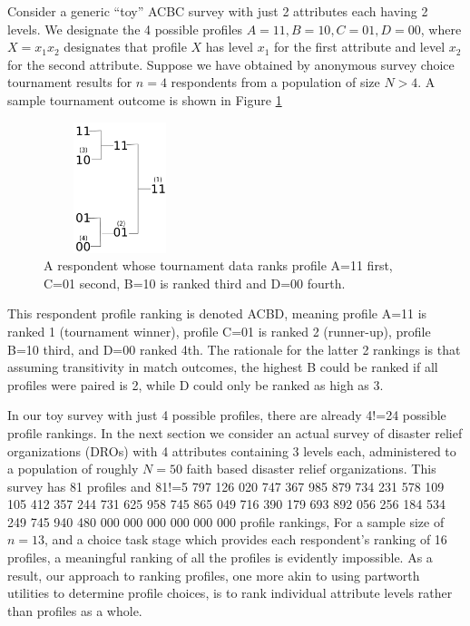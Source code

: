 \documentclass[a4paper, 12pt]{article}
\begin{document}
Consider a generic ``toy'' ACBC survey with just 2 attributes each having 2 levels. We designate the 4 possible profiles $A=11, B=10, C=01, D=00$, where $X=x_1x_2$ designates that profile $X$ has level $x_1$ for the first attribute and level $x_2$ for the second attribute. Suppose we have obtained by anonymous survey choice tournament results  for $n=4$ respondents from a population of size $N>4$.  A sample tournament outcome is shown in Figure \ref{SimpleTourn}
\begin{figure}[!htpb]
\centering
\includegraphics[width=1.75in, height=1.5in]{SimpleTourn.png}
\caption{A respondent whose tournament data ranks profile A=11 first, C=01 second, B=10 is ranked third and D=00 fourth.  }
\label{SimpleTourn}
\end{figure}

{\flushleft This} respondent profile ranking is denoted ACBD, meaning profile A=11 is ranked 1 (tournament winner), profile C=01 is ranked 2 (runner-up), profile B=10 third, and D=00 ranked 4th. The rationale for the latter 2 rankings is that assuming transitivity in match outcomes, the highest B could be ranked if all profiles were paired is 2, while D could only be ranked as high as 3. 

In our toy survey with just 4 possible profiles, there are already 4!=24 possible profile rankings. In the next section we consider an actual survey of disaster relief organizations (DROs) with 4 attributes containing 3 levels each, administered to a population of roughly $N=50$ faith based disaster relief organizations. This survey  has 81 profiles and 81!=5 797 126 020 747 367 985 879 734 231 578 109 105 412 357 244 731 625 958 745 865 049 716 390
 179 693 892 056 256 184 534 249 745 940 480 000 000 000 000 000 000 profile rankings,  For a sample size of $n=13$, and a choice task stage  which provides each respondent's ranking of 16 profiles, a meaningful ranking of  all the profiles is evidently impossible. As a result, our approach to ranking profiles, one more akin to using partworth utilities to determine profile choices, is to rank individual attribute levels rather than profiles as a whole. 
\end{document}

